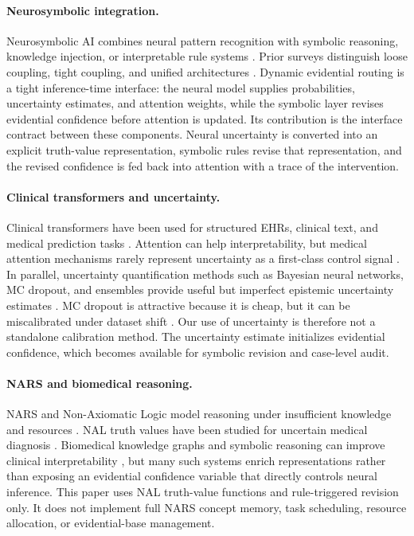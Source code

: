 \documentclass{article}
\begin{document}
\paragraph{Neurosymbolic integration.}
Neurosymbolic AI combines neural pattern recognition with symbolic reasoning, knowledge injection, or interpretable rule systems \citep{garcez2020,marra2021,bhuyan2024,colelough2025}. Prior surveys distinguish loose coupling, tight coupling, and unified architectures \citep{hilario1997,nawaz2025}. Dynamic evidential routing is a tight inference-time interface: the neural model supplies probabilities, uncertainty estimates, and attention weights, while the symbolic layer revises evidential confidence before attention is updated. Its contribution is the interface contract between these components. Neural uncertainty is converted into an explicit truth-value representation, symbolic rules revise that representation, and the revised confidence is fed back into attention with a trace of the intervention.

\paragraph{Clinical transformers and uncertainty.}
Clinical transformers have been used for structured EHRs, clinical text, and medical prediction tasks \citep{rasmy2021,li2019,dai2025}. Attention can help interpretability, but medical attention mechanisms rarely represent uncertainty as a first-class control signal \citep{goncalves2022}. In parallel, uncertainty quantification methods such as Bayesian neural networks, MC dropout, and ensembles provide useful but imperfect epistemic uncertainty estimates \citep{blundell2015,gal2016,lakshminarayanan2017,abad2025}. MC dropout is attractive because it is cheap, but it can be miscalibrated under dataset shift \citep{ovadia2019}. Our use of uncertainty is therefore not a standalone calibration method. The uncertainty estimate initializes evidential confidence, which becomes available for symbolic revision and case-level audit.

\paragraph{NARS and biomedical reasoning.}
NARS and Non-Axiomatic Logic model reasoning under insufficient knowledge and resources \citep{wang1995,wang2006,wang2022}. NAL truth values have been studied for uncertain medical diagnosis \citep{wang2013}. Biomedical knowledge graphs and symbolic reasoning can improve clinical interpretability \citep{wu2023,abusalih2023,rajabi2022,jiang2024,chudasama2025}, but many such systems enrich representations rather than exposing an evidential confidence variable that directly controls neural inference. This paper uses NAL truth-value functions and rule-triggered revision only. It does not implement full NARS concept memory, task scheduling, resource allocation, or evidential-base management.
\end{document}
